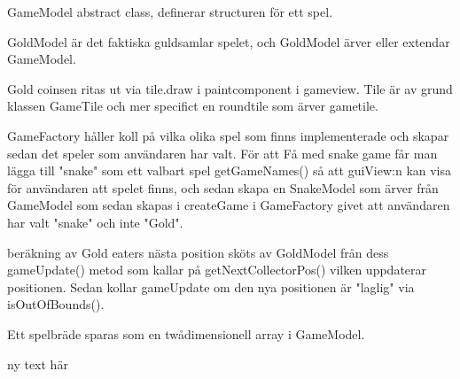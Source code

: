 \documentclass[12pt]{article}
\begin{document}
\begin{figure}[H]
	\centering
	
	\caption{\label{fig:GoldModelInherit}}
\end{figure}

GameModel abstract class, definerar structuren för ett spel. 

GoldModel är det faktiska guldsamlar spelet, och GoldModel ärver eller extendar GameModel.



Gold coinsen ritas ut via tile.draw i paintcomponent i gameview. Tile är av grund klassen GameTile och mer specifict en roundtile som ärver gametile.

GameFactory håller koll på vilka olika spel som finns implementerade och skapar sedan det speler som användaren har valt. För att Få med snake game får man lägga till "snake" som ett valbart spel getGameNames() så att guiView:n kan visa för användaren att spelet finns, och sedan skapa en SnakeModel som ärver från GameModel som sedan skapas i createGame i GameFactory givet att användaren har valt "snake" och inte "Gold".

beräkning av Gold eaters nästa position sköts av GoldModel från dess gameUpdate() metod som kallar på getNextCollectorPos() vilken uppdaterar positionen. Sedan kollar gameUpdate om den nya positionen är "laglig" via isOutOfBounds().

Ett spelbräde sparas som en twådimensionell array i GameModel.


\begin{figure}[H]
	\centering
	
\end{figure}

\restoregeometry

ny text här
\end{document}
